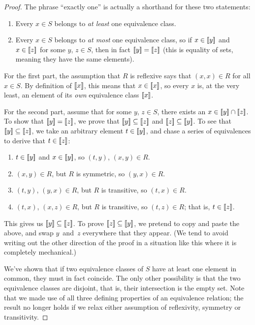 \documentclass[../generics]{subfiles}
\begin{document}
\begin{proof}
The phrase ``exactly one'' is actually a shorthand for these two statements:
\begin{enumerate}
\item Every $x\in S$ belongs to \emph{at least} one equivalence class.
\item Every $x\in S$ belongs to \emph{at most} one equivalence class, so if $x\in[\![y]\!]$ and $x\in[\![z]\!]$ for some $y$, $z\in S$, then in fact $[\![y]\!]=[\![z]\!]$ (this is equality of sets, meaning they have the same elements).
\end{enumerate}

For the first part, the assumption that $R$ is reflexive says that $(x,x)\in R$ for all $x\in S$. By definition of $[\![x]\!]$, this means that $x\in[\![x]\!]$, so every $x$ is, at the very least, an element of its \emph{own} equivalence class $[\![x]\!]$.

For the second part, assume that for some $y$, $z\in S$, there exists an $x\in[\![y]\!]\cap[\![z]\!]$. To show that $[\![y]\!]=[\![z]\!]$, we prove that $[\![y]\!]\subseteq[\![z]\!]$ and $[\![z]\!]\subseteq[\![y]\!]$. To see that $[\![y]\!]\subseteq[\![z]\!]$, we take an arbitrary element $t\in[\![y]\!]$, and chase a series of equivalences to derive that $t\in[\![z]\!]$:
\begin{enumerate}
\item $t\in[\![y]\!]$ and $x\in[\![y]\!]$, so $(t,y)$, $(x,y)\in R$.
\item $(x,y)\in R$, but $R$ is symmetric, so $(y,x)\in R$.
\item $(t,y)$, $(y,x)\in R$, but $R$ is transitive, so $(t,x)\in R$.
\item $(t,x)$, $(x,z)\in R$, but $R$ is transitive, so $(t,z)\in R$; that is, $t\in[\![z]\!]$.
\end{enumerate}
This gives us $[\![y]\!]\subseteq[\![z]\!]$. To prove $[\![z]\!]\subseteq[\![y]\!]$, we pretend to copy and paste the above, and swap $y$~and~$z$ everywhere that they appear. (We tend to avoid writing out the other direction of the proof in a situation like this where it is completely mechanical.)

We've shown that if two equivalence classes of $S$ have at least one element in common, they must in fact coincide. The only other possibility is that the two equivalence classes are disjoint, that is, their intersection is the empty set. Note that we made use of all three defining properties of an equivalence relation; the result no longer holds if we relax either assumption of reflexivity, symmetry or transitivity.
\end{proof}
\end{document}
